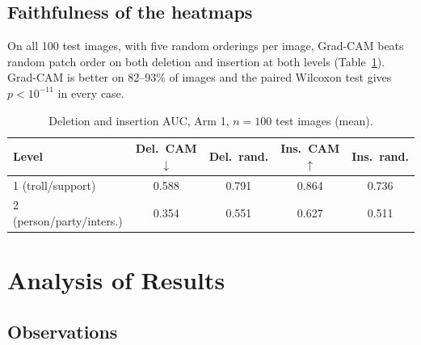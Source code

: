 \subsection{Faithfulness of the heatmaps}
\label{sec:faith}

On all 100 test images, with five random orderings per image, Grad-CAM beats random patch order on both deletion and insertion at both levels (Table~\ref{tab:faith}). Grad-CAM is better on 82--93\% of images and the paired Wilcoxon test gives $p<10^{-11}$ in every case.

\begin{table}[h]
\centering
\caption{Deletion and insertion AUC, Arm 1, $n=100$ test images (mean).}
\label{tab:faith}
\small
\begin{tabular}{lcccc}
\toprule
Level & Del.\ CAM $\downarrow$ & Del.\ rand. & Ins.\ CAM $\uparrow$ & Ins.\ rand. \\
\midrule
1 (troll/support) & 0.588 & 0.791 & 0.864 & 0.736 \\
2 (person/party/inters.) & 0.354 & 0.551 & 0.627 & 0.511 \\
\bottomrule
\end{tabular}
\end{table}

\section{Analysis of Results}

\subsection{Observations}

